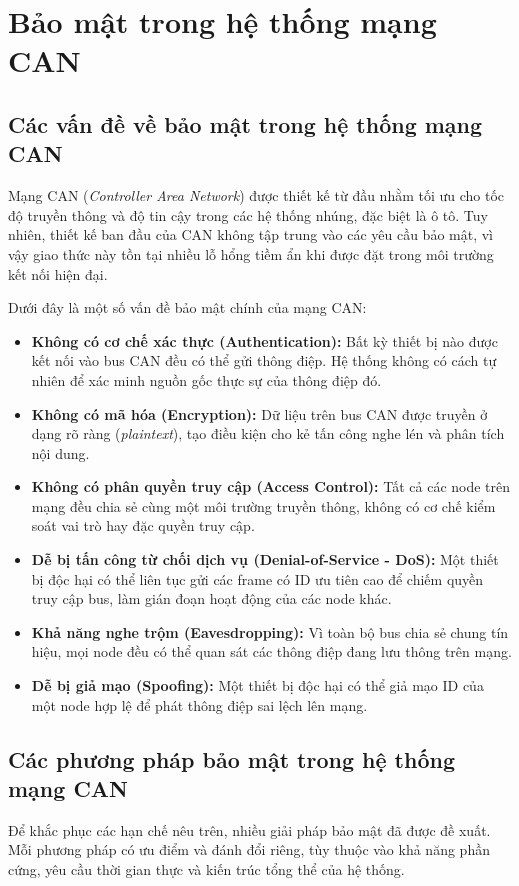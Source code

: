 \chapter{Bảo mật trong hệ thống mạng CAN}

\section{Các vấn đề về bảo mật trong hệ thống mạng CAN}
Mạng CAN (\textit{Controller Area Network}) được thiết kế từ đầu nhằm tối ưu cho tốc độ truyền thông và độ tin cậy trong các hệ thống nhúng, đặc biệt là ô tô. Tuy nhiên, thiết kế ban đầu của CAN không tập trung vào các yêu cầu bảo mật, vì vậy giao thức này tồn tại nhiều lỗ hổng tiềm ẩn khi được đặt trong môi trường kết nối hiện đại.

Dưới đây là một số vấn đề bảo mật chính của mạng CAN:

\begin{itemize}[leftmargin=*]
    \item \textbf{Không có cơ chế xác thực (Authentication):} Bất kỳ thiết bị nào được kết nối vào bus CAN đều có thể gửi thông điệp. Hệ thống không có cách tự nhiên để xác minh nguồn gốc thực sự của thông điệp đó.
    \item \textbf{Không có mã hóa (Encryption):} Dữ liệu trên bus CAN được truyền ở dạng rõ ràng (\textit{plaintext}), tạo điều kiện cho kẻ tấn công nghe lén và phân tích nội dung.
    \item \textbf{Không có phân quyền truy cập (Access Control):} Tất cả các node trên mạng đều chia sẻ cùng một môi trường truyền thông, không có cơ chế kiểm soát vai trò hay đặc quyền truy cập.
    \item \textbf{Dễ bị tấn công từ chối dịch vụ (Denial-of-Service - DoS):} Một thiết bị độc hại có thể liên tục gửi các frame có ID ưu tiên cao để chiếm quyền truy cập bus, làm gián đoạn hoạt động của các node khác.
    \item \textbf{Khả năng nghe trộm (Eavesdropping):} Vì toàn bộ bus chia sẻ chung tín hiệu, mọi node đều có thể quan sát các thông điệp đang lưu thông trên mạng.
    \item \textbf{Dễ bị giả mạo (Spoofing):} Một thiết bị độc hại có thể giả mạo ID của một node hợp lệ để phát thông điệp sai lệch lên mạng.
\end{itemize}

\section{Các phương pháp bảo mật trong hệ thống mạng CAN}
Để khắc phục các hạn chế nêu trên, nhiều giải pháp bảo mật đã được đề xuất. Mỗi phương pháp có ưu điểm và đánh đổi riêng, tùy thuộc vào khả năng phần cứng, yêu cầu thời gian thực và kiến trúc tổng thể của hệ thống.

